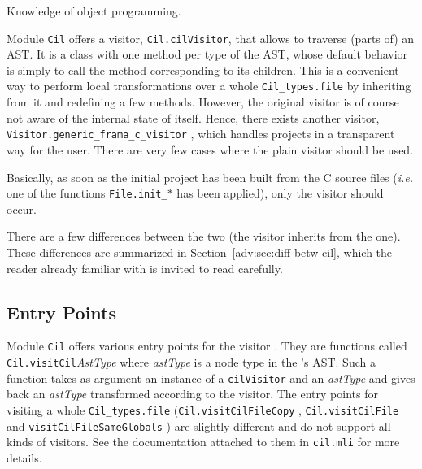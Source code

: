 \begin{prereq}
  Knowledge of \caml object programming.
\end{prereq}

Module \texttt{Cil} offers a visitor,
\verb+Cil.cilVisitor+, 
that allows to traverse (parts of) an
AST. It is a class with one method per type of the AST, whose
default behavior is simply to call the method corresponding to its
children. This is a convenient way to perform local transformations over a
whole \verb+Cil_types.file+ by inheriting from it
and redefining a few methods. However, the original \cil visitor is of course
not aware of the internal state of \framac itself. Hence,
there exists another visitor, \verb+Visitor.generic_frama_c_visitor+%
, which handles
projects in a transparent way for the user. There are very few
cases where the plain \cil visitor should be used.

\begin{important}
  Basically, as soon as the initial project has been
  built from the C source files (\emph{i.e.} one of the functions
  \texttt{File.init\_$*$}%
   has been applied), only the \framac
  visitor should occur.
\end{important}

There are a few differences between the two (the \framac visitor
inherits from the \cil one).  These differences are summarized in
Section~\ref{adv:sec:diff-betw-cil}, which the reader already familiar with
\cil is invited to read carefully.

\subsection{Entry Points}

Module \texttt{Cil} offers various entry points for the visitor%
. They are functions called
\verb+Cil.visitCil+\emph{AstType} where
\emph{astType} is a node type in the \cil's AST. Such a function takes as
argument an instance of a \verb+cilVisitor+ and an
\emph{astType} and gives back an \emph{astType} transformed according to the
visitor. The entry points for visiting a whole
\verb+Cil_types.file+ (\verb+Cil.visitCilFileCopy+%
, \verb+Cil.visitCilFile+%
 and \verb+visitCilFileSameGlobals+%
) are slightly different and do not
support all kinds of visitors.  See the documentation attached to them in
\verb+cil.mli+ for more details.

